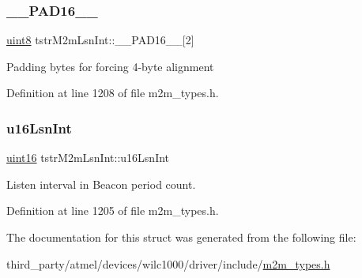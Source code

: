 \subsubsection{\texorpdfstring{\+\_\+\+\_\+\+P\+A\+D16\+\_\+\+\_\+}{\_\_PAD16\_\_}}
{\footnotesize\ttfamily \hyperlink{group__DataT_ga4df709a77647e870bbf1d955b8edc9a6}{uint8} tstr\+M2m\+Lsn\+Int\+::\+\_\+\+\_\+\+P\+A\+D16\+\_\+\+\_\+\mbox{[}2\mbox{]}}

Padding bytes for forcing 4-\/byte alignment 

Definition at line 1208 of file m2m\+\_\+types.\+h.

\mbox{\label{structtstrM2mLsnInt_a98178fb9e7382eacae7995daff8396a1}} 
\subsubsection{\texorpdfstring{u16\+Lsn\+Int}{u16LsnInt}}
{\footnotesize\ttfamily \hyperlink{group__DataT_ga1daa745171fc6e31d942c161422a76f9}{uint16} tstr\+M2m\+Lsn\+Int\+::u16\+Lsn\+Int}

Listen interval in Beacon period count. 

Definition at line 1205 of file m2m\+\_\+types.\+h.



The documentation for this struct was generated from the following file\+:\begin{DoxyCompactItemize}
\item 
third\+\_\+party/atmel/devices/wilc1000/driver/include/\hyperlink{m2m__types_8h}{m2m\+\_\+types.\+h}\end{DoxyCompactItemize}
